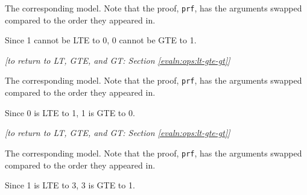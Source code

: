     \newpage
    
    
    
    The corresponding \Idris model. Note that the proof, \texttt{prf}, has the arguments swapped compared to the order they appeared in.
    
    
    Since 1 cannot be LTE to 0, 0 cannot be GTE to 1.
    \\
    
    \begin{flushright}
        \textit{[to return to LT, GTE, and GT: Section \ref{evaln:ops:lt-gte-gt}]}
    \end{flushright}
    
    \newpage
    
    
    
    The corresponding \Idris model. Note that the proof, \texttt{prf}, has the arguments swapped compared to the order they appeared in.
    
    
    Since 0 is LTE to 1, 1 is GTE to 0.
    \\
    
    \begin{flushright}
        \textit{[to return to LT, GTE, and GT: Section \ref{evaln:ops:lt-gte-gt}]}
    \end{flushright}
    
    \newpage
    
    
    
    The corresponding \Idris model. Note that the proof, \texttt{prf}, has the arguments swapped compared to the order they appeared in.
    
    
    Since 1 is LTE to 3, 3 is GTE to 1.
    \\
    

